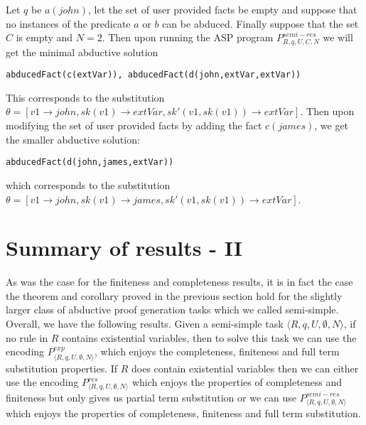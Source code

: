 Let $q$ be $a(john)$, let the set of user provided facts be empty and suppose that no instances of the predicate $a$ or $b$ can be abduced. Finally suppose that the set $C$ is empty and $N=2$. Then upon running the ASP program $P_{R,q,U,C,N}^{semi-res}$ we will get the minimal abductive solution \begin{lstlisting}[frame=none]
abducedFact(c(extVar)), abducedFact(d(john,extVar,extVar))
\end{lstlisting} 
This corresponds to the substitution $\theta =[v1\rightarrow john,sk(v1) \rightarrow extVar, sk'(v1,sk(v1))\rightarrow extVar]$. Then upon modifying the set of user provided facts by adding the fact $c(james)$, we get the smaller abductive solution:
\begin{lstlisting}[frame=none]
abducedFact(d(john,james,extVar))
\end{lstlisting} which corresponds to the substitution $\theta =[v1\rightarrow john,sk(v1) \rightarrow james, sk'(v1,sk(v1))\rightarrow extVar]$. 
\section{Summary of results - II}
As was the case for the finiteness and completeness results, it is in fact the case the theorem and corollary proved in the previous section hold for the slightly larger class of abductive proof generation tasks which we called semi-simple. Overall, we have the following results. Given a semi-simple task $\langle R,q,U,\emptyset,N\rangle$, if no rule in $R$ contains existential variables, then to solve this task we can use the encoding $P_{\langle R,q,U,\emptyset,N\rangle}^{exp}$, which enjoys the completeness, finiteness and full term substitution properties. If $R$ does contain existential variables then we can either use the encoding $P_{\langle R,q,U,\emptyset,N\rangle}^{res}$ which enjoys the properties of completeness and finiteness but only gives us partial term substitution or we can use $P_{\langle R,q,U,\emptyset,N\rangle}^{semi-res}$ which enjoys the properties of completeness, finiteness and full term substitution. 



